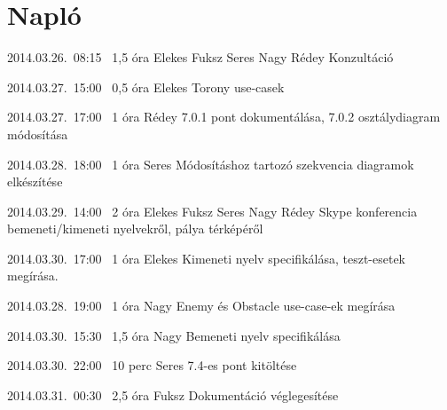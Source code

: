 %
\section{Napló}

\begin{naplo}

\bejegyzes
{2014.03.26.~08:15~}
{1,5 óra}
{Elekes\newline
Fuksz\newline
Seres\newline
Nagy\newline
Rédey}
{Konzultáció}

\bejegyzes
{2014.03.27.~15:00~}
{0,5 óra}
{Elekes}
{Torony  use-casek}

\bejegyzes
{2014.03.27.~17:00~}
{1 óra}
{Rédey}
{7.0.1 pont dokumentálása, 7.0.2 osztálydiagram módosítása}

\bejegyzes
{2014.03.28.~18:00~}
{1 óra}
{Seres}
{Módosításhoz tartozó szekvencia diagramok elkészítése}

\bejegyzes
{2014.03.29.~14:00~}
{2 óra}
{Elekes\newline
Fuksz\newline
Seres\newline
Nagy\newline
Rédey}
{Skype konferencia bemeneti/kimeneti nyelvekről, pálya térképéről}

\bejegyzes
{2014.03.30.~17:00~}
{1 óra}
{Elekes}
{Kimeneti nyelv specifikálása, teszt-esetek megírása.}

\bejegyzes
{2014.03.28.~19:00~}
{1 óra}
{Nagy}
{Enemy és Obstacle use-case-ek megírása}

\bejegyzes
{2014.03.30.~15:30~}
{1,5 óra}
{Nagy}
{Bemeneti nyelv specifikálása}

\bejegyzes
{2014.03.30.~22:00~}
{10 perc}
{Seres}
{7.4-es pont kitöltése}

\bejegyzes
{2014.03.31.~00:30~}
{2,5 óra}
{Fuksz}
{Dokumentáció véglegesítése}


\end{naplo}


